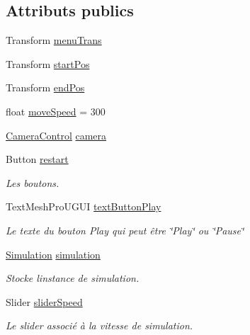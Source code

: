 \subsection*{Attributs publics}
\begin{DoxyCompactItemize}
\item 
Transform \mbox{\hyperlink{class_menu_visualization_u_i_a491555371450cb31cfb730f16ab5a0bd}{menu\+Trans}}
\item 
Transform \mbox{\hyperlink{class_menu_visualization_u_i_afd585b84497729b656706b4f163defe1}{start\+Pos}}
\item 
Transform \mbox{\hyperlink{class_menu_visualization_u_i_aca26bc81a47e95274e282b0688d48ab0}{end\+Pos}}
\item 
float \mbox{\hyperlink{class_menu_visualization_u_i_a13e28cb9219cab1e48b80d75be689603}{move\+Speed}} = 300
\item 
\mbox{\hyperlink{class_camera_control}{Camera\+Control}} \mbox{\hyperlink{class_menu_visualization_u_i_acbeec950a81f60bf3cd493d9e4a99896}{camera}}
\item 
Button \mbox{\hyperlink{class_menu_visualization_u_i_ab14033508bbd734ad84b841cccbbdbaa}{restart}}
\begin{DoxyCompactList}\small\item\em Les boutons. \end{DoxyCompactList}\item 
Text\+Mesh\+Pro\+U\+G\+UI \mbox{\hyperlink{class_menu_visualization_u_i_aff6c8da4a2af320451a956a18e4e891b}{text\+Button\+Play}}
\begin{DoxyCompactList}\small\item\em Le texte du bouton Play qui peut être \char`\"{}\+Play\char`\"{} ou \char`\"{}\+Pause\char`\"{} \end{DoxyCompactList}\item 
\mbox{\hyperlink{class_simulation}{Simulation}} \mbox{\hyperlink{class_menu_visualization_u_i_afa6725a6bef7e1c90a66a28485a241b3}{simulation}}
\begin{DoxyCompactList}\small\item\em Stocke l\textquotesingle{}instance de simulation. \end{DoxyCompactList}\item 
Slider \mbox{\hyperlink{class_menu_visualization_u_i_a91d9a2a50167c5d57b7df5ad88cc48a9}{slider\+Speed}}
\begin{DoxyCompactList}\small\item\em Le slider associé à la vitesse de simulation. \end{DoxyCompactList}\item 

\end{DoxyCompactItemize}
